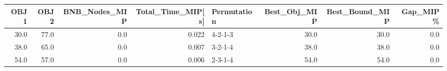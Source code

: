 \begin{tabular}{rrrrlrrr}
\toprule
 OBJ1 &  OBJ2 &  BNB\_Nodes\_MIP &  Total\_Time\_MIP[s] & Permutation &  Best\_Obj\_MIP &  Best\_Bound\_MIP &  Gap\_MIP\% \\
\midrule
 30.0 &  77.0 &            0.0 &              0.022 &     4-2-1-3 &          30.0 &            30.0 &       0.0 \\
 38.0 &  65.0 &            0.0 &              0.007 &     3-2-1-4 &          38.0 &            38.0 &       0.0 \\
 54.0 &  57.0 &            0.0 &              0.006 &     2-3-1-4 &          54.0 &            54.0 &       0.0 \\
\bottomrule
\end{tabular}
